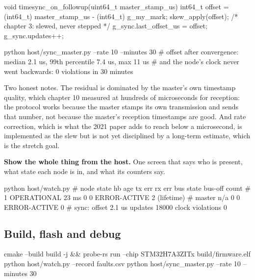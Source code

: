 \begin{steps}
\begin{ccode}
void timesync_on_followup(uint64_t master_stamp_us)
{
    int64_t offset = (int64_t) master_stamp_us - (int64_t) g_my_mark;
    skew_apply(offset);              /* chapter 3: slewed, never stepped */
    g_sync.last_offset_us = offset;
    g_sync.updates++;
}
\end{ccode}
\begin{shellcode}
python host/sync_master.py --rate 10 --minutes 30
# offset after convergence: median 2.1 us, 99th percentile 7.4 us, max 11 us
# and the node's clock never went backwards: 0 violations in 30 minutes
\end{shellcode}
Two honest notes. The residual is dominated by the master's own timestamp
quality, which chapter 10 measured at hundreds of microseconds for reception:
the protocol works because the master stamps its own transmission and sends that
number, not because the master's reception timestamps are good. And rate
correction, which is what the 2021 paper adds to reach below a microsecond, is
implemented as the slew but is not yet disciplined by a long-term estimate,
which is the stretch goal.

\item \textbf{Show the whole thing from the host.} One screen that says who is
present, what state each node is in, and what its counters say.
\begin{shellcode}
python host/watch.py
# node  state         hb age   tx err  rx err  bus state      bus-off count
#    1  OPERATIONAL    23 ms        0       0  ERROR-ACTIVE   2 (lifetime)
#    master           n/a           0       0  ERROR-ACTIVE   0
# sync: offset 2.1 us  updates 18000  clock violations 0
\end{shellcode}
\end{steps}

\subsection*{Build, flash and debug}


\begin{shellcode}
cmake --build build -j && probe-rs run --chip STM32H7A3ZITx build/firmware.elf
python host/watch.py --record faults.csv
python host/sync_master.py --rate 10 --minutes 30
\end{shellcode}

